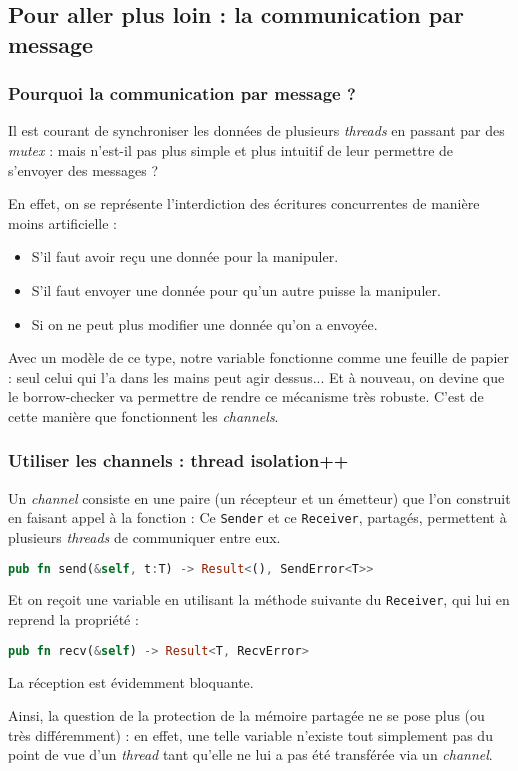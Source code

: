 \subsection{Pour aller plus loin : la communication par message}
\begin{frame}
  \frametitle{Pourquoi la communication par message ?}
  Il est courant de synchroniser les données de plusieurs \textit{threads} en passant par des \textit{mutex} : mais n'est-il pas plus simple et plus intuitif de leur permettre de s'envoyer des messages ?

En effet, on se représente l'interdiction des écritures concurrentes de manière moins artificielle :
\begin{itemize}
\item  S'il faut avoir reçu une donnée pour la manipuler.
\item  S'il faut envoyer une donnée pour qu'un autre puisse la manipuler.
\item  Si on ne peut plus modifier une donnée qu'on a envoyée.
\end{itemize}

Avec un modèle de ce type, notre variable fonctionne comme une feuille de papier : seul celui qui l'a dans les mains peut agir dessus... Et à nouveau, on devine que le borrow-checker va permettre de rendre ce mécanisme très robuste. C'est de cette manière que fonctionnent les \textit{channels}.
\end{frame}

\begin{frame}[fragile]
  \frametitle{Utiliser les channels : thread isolation++}
  Un \textit{channel} consiste en une paire (un récepteur et un émetteur) que l'on construit en faisant appel à la fonction :
  Ce \texttt{Sender} et ce \texttt{Receiver}, partagés, permettent à plusieurs \textit{threads} de communiquer entre eux.
  \begin{lstlisting}[language=rust]
pub fn send(&self, t:T) -> Result<(), SendError<T>>
  \end{lstlisting}
  Et on reçoit une variable en utilisant la méthode suivante du \texttt{Receiver}, qui lui en reprend la propriété :
  \begin{lstlisting}[language=rust]
pub fn recv(&self) -> Result<T, RecvError>
  \end{lstlisting}
La réception est évidemment bloquante.

Ainsi, la question de la protection de la mémoire partagée ne se pose plus (ou très différemment) : en effet, une telle variable n'existe tout simplement pas du point de vue d'un \textit{thread} tant qu'elle ne lui a pas été transférée via un \textit{channel}.
\end{frame}

